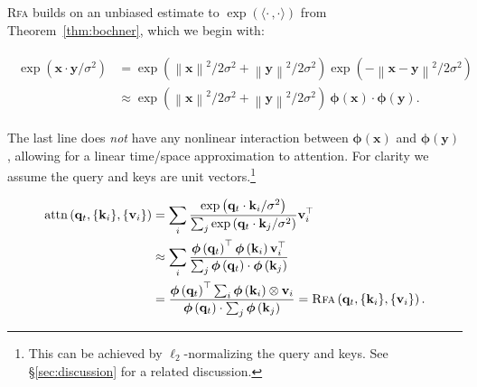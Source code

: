 \textsc{Rfa} builds on an unbiased estimate to $\exp(\langle\boldsymbol{\cdot}\,,\boldsymbol{\cdot}\rangle)$
from Theorem~\ref{thm:bochner}, which we begin with:

\begin{align}\label{eq:approx_dot_exp}
\begin{split}
    \exp\left({{\mathbf{x}}\cdot{\mathbf{y}} / \sigma^2} \right)
    &= \exp \left({\left\lVert{\mathbf{x}}\right\rVert^2/2\sigma^2 + \left\lVert{\mathbf{y}}\right\rVert^2/2\sigma^2}\right) \exp\left({-\left\lVert{\mathbf{x}}-{\mathbf{y}}\right\rVert^2 / 2\sigma^2} \right)\\
    &\approx \exp \left({\left\lVert{\mathbf{x}}\right\rVert^2/2\sigma^2 + \left\lVert{\mathbf{y}}\right\rVert^2/2\sigma^2}\right)\ 
    \boldsymbol{\phi}\left({\mathbf{x}}\right)\cdot \boldsymbol{\phi}\left({\mathbf{y}}\right).
\end{split}
\end{align}

The last line does \emph{not} have any nonlinear interaction between $\boldsymbol{\phi}({\mathbf{x}})$ and $\boldsymbol{\phi}({\mathbf{y}})$,
allowing for a linear time/space approximation to attention. For clarity we assume the query and keys are unit vectors.\footnote{
This can be achieved by $\ell_2$-normalizing the query and keys. See \S\ref{sec:discussion} for a related discussion.}

\begin{align}\label{eq:approx_softmax}
\begin{split}
    \operatorname{attn}\left({\mathbf{q}}_t,\{{\mathbf{k}}_i\},\{{\mathbf{v}}_i\}\right)
    &=\sum_i
    \frac{\exp\left({\mathbf{q}}_t\cdot{\mathbf{k}}_i /\sigma^2\right)}
    {\sum_j\exp\left({\mathbf{q}}_t\cdot{\mathbf{k}}_j /\sigma^2\right)}{\mathbf{v}}_i^\top\\
    &\approx 
    \sum_i\frac{\boldsymbol{\phi}\left({\mathbf{q}}_t\right)^\top \boldsymbol{\phi}\left({\mathbf{k}}_i\right){\mathbf{v}}_i^\top}
    {\sum_j\boldsymbol{\phi}\left({\mathbf{q}}_t\right) \cdot \boldsymbol{\phi}\left({\mathbf{k}}_j\right)}\\
    &= \frac{\boldsymbol{\phi}\left({\mathbf{q}}_t\right)^\top\sum_i \boldsymbol{\phi}\left({\mathbf{k}}_i\right)\otimes{\mathbf{v}}_i}
    {\boldsymbol{\phi}\left({\mathbf{q}}_t\right)\cdot\sum_j \boldsymbol{\phi}\left({\mathbf{k}}_j\right)}
    =\textsc{Rfa}\left({\mathbf{q}}_t,\{{\mathbf{k}}_i\},\{{\mathbf{v}}_i\}\right).
\end{split}
\end{align}

